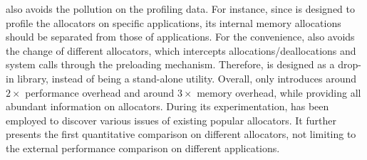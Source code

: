 \MP{} also avoids the pollution on the profiling data. For instance, since \MP{} is designed to profile the allocators on specific applications, its internal memory allocations should be separated from those  of applications. For the convenience, \MP{} also avoids the change of different allocators, which intercepts allocations/deallocations and system calls through the preloading mechanism. Therefore, \MP{} is designed as a drop-in library, instead of being a stand-alone utility. Overall, \MP{} only introduces around $2\times$ performance overhead and around $3\times$ memory overhead, while providing all abundant information on allocators. During its experimentation, \MP{} has been employed to discover various issues of existing popular allocators. It further presents the first quantitative comparison on different allocators, not limiting to the external performance comparison on different applications.  



\begin{comment}

1. Maybe we should detect the contention rate. If the last write is from a different thread, we will detect one contention. 
 
allocator: can we use some different configurations of the same allocator?
Can we use the same allocator on different applications, achieving different allocators?  
}





performance overhead: 
1. Using the hash maps to identify the size of each object is very slow. 
2. Turning multiple reads into one read around 2 or three times. 
3. Using the new mapping mechanism. 

How we can do that for glibc. We migrate the glibc as separate library, allowing us to intercept system or libraries. 

How to figure out the metadata information?
	
\end{comment}

 

